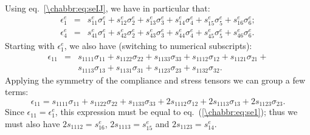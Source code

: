 Using eq.~\ref{\chabbr:eq:seIJ}, we have in particular that:
\begin{eqnarray}
	\epsilon^e_1 &=& s^e_{11}\sigma^e_1+s^e_{12}\sigma^e_2+s^e_{13}\sigma^e_3+s^e_{14}\sigma^e_4+s^e_{15}\sigma^e_5+s^e_{16}\sigma^e_6;\label{\chabbr:eq:se1}\\
	\epsilon^e_4 &=& s^e_{41}\sigma^e_1+s^e_{42}\sigma^e_2+s^e_{43}\sigma^e_3+s^e_{44}\sigma^e_4+s^e_{45}\sigma^e_5+s^e_{46}\sigma^e_6\label{\chabbr:eq:se4}.
\end{eqnarray}
Starting with $\epsilon^e_1$, we also have (switching to numerical subscripts):
\begin{eqnarray*}
	\epsilon_{11} &=& s_{1111}\sigma_{11} + s_{1122}\sigma_{22} + s_{1133}\sigma_{33} +  s_{1112}\sigma_{12} +  s_{1121}\sigma_{21}  + \\ 
	&& s_{1113}\sigma_{13}+ s_{1131}\sigma_{31} + s_{1123}\sigma_{23} + s_{1132}\sigma_{32}. 
\end{eqnarray*}
Applying the symmetry of the compliance and stress tensors we can group a few terms:
\[	
	\epsilon_{11} = s_{1111}\sigma_{11} + s_{1122}\sigma_{22} + s_{1133}\sigma_{33} + 2 s_{1112}\sigma_{12} +2 s_{1113}\sigma_{13} +2 s_{1123}\sigma_{23}. 
\]
Since $\epsilon_{11}=\epsilon^e_1$, this expression must be equal to eq.~(\ref{\chabbr:eq:se1}); thus we must also have $2s_{1112} = s^e_{16}$, $2s_{1113}=s^e_{15}$ and $2s_{1123} = s^e_{14}$.

